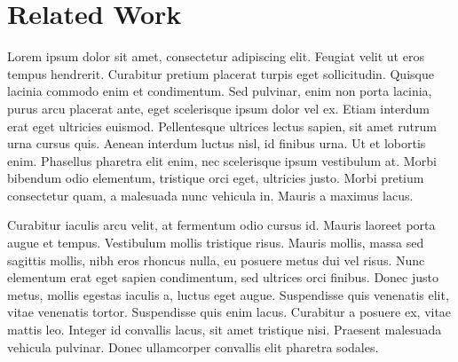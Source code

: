 \section{Related Work}
Lorem ipsum dolor sit amet, consectetur adipiscing elit. 
Feugiat velit ut eros tempus hendrerit.
Curabitur pretium placerat turpis eget sollicitudin.
Quisque lacinia commodo enim et condimentum.
Sed pulvinar, enim non porta lacinia, purus arcu placerat ante, eget scelerisque ipsum dolor vel ex.
Etiam interdum erat eget ultricies euismod.
Pellentesque ultrices lectus sapien, sit amet rutrum urna cursus quis.
Aenean interdum luctus nisl, id finibus urna.
Ut et lobortis enim.
Phasellus pharetra elit enim, nec scelerisque ipsum vestibulum at.
Morbi bibendum odio elementum, tristique orci eget, ultricies justo.
Morbi pretium consectetur quam, a malesuada nunc vehicula in.
Mauris a maximus lacus.


Curabitur iaculis arcu velit, at fermentum odio cursus id.
Mauris laoreet porta augue et tempus.
Vestibulum mollis tristique risus.
Mauris mollis, massa sed sagittis mollis, nibh eros rhoncus nulla, eu posuere metus dui vel risus.
Nunc elementum erat eget sapien condimentum, sed ultrices orci finibus.
Donec justo metus, mollis egestas iaculis a, luctus eget augue.
Suspendisse quis venenatis elit, vitae venenatis tortor.
Suspendisse quis enim lacus.
Curabitur a posuere ex, vitae mattis leo.
Integer id convallis lacus, sit amet tristique nisi.
Praesent malesuada vehicula pulvinar.
Donec ullamcorper convallis elit pharetra sodales.
